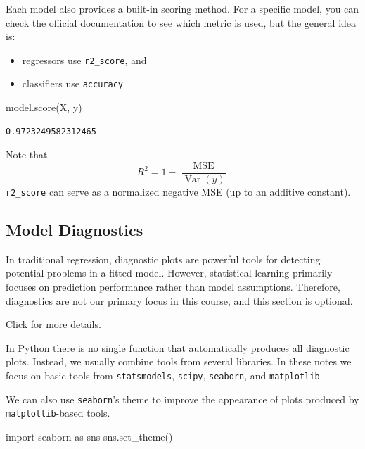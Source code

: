 \documentclass[
  letterpaper,
  DIV=11,
  numbers=noendperiod]{scrreprt}
\newenvironment{Shaded}{\begin{snugshade}}{\end{snugshade}}
\newcommand{\ImportTok}[1]{\textcolor[rgb]{0.00,0.46,0.62}{#1}}
\newcommand{\NormalTok}[1]{\textcolor[rgb]{0.00,0.23,0.31}{#1}}
\providecommand{\tightlist}{%
  \setlength{\itemsep}{0pt}\setlength{\parskip}{0pt}}
\theoremstyle{definition}
\theoremstyle{definition}
\theoremstyle{plain}
\theoremstyle{plain}
\theoremstyle{remark}
\begin{document}
Each model also provides a built-in scoring method. For a specific
model, you can check the official documentation to see which metric is
used, but the general idea is:

\begin{itemize}
\tightlist
\item
  regressors use \texttt{r2\_score}, and
\item
  classifiers use \texttt{accuracy}
\end{itemize}

\begin{Shaded}
\begin{Highlighting}[]
\NormalTok{model.score(X, y)}
\end{Highlighting}
\end{Shaded}

\begin{verbatim}
0.9723249582312465
\end{verbatim}

Note that \[
R^2=1-\frac{\operatorname{MSE}}{\operatorname{Var}(y)}
\] \texttt{r2\_score} can serve as a normalized negative MSE (up to an
additive constant).

\subsection{Model Diagnostics}\label{model-diagnostics}

In traditional regression, diagnostic plots are powerful tools for
detecting potential problems in a fitted model. However, statistical
learning primarily focuses on prediction performance rather than model
assumptions. Therefore, diagnostics are not our primary focus in this
course, and this section is optional.

Click for more details.

In Python there is no single function that automatically produces all
diagnostic plots. Instead, we usually combine tools from several
libraries. In these notes we focus on basic tools from
\texttt{statsmodels}, \texttt{scipy}, \texttt{seaborn}, and
\texttt{matplotlib}.

We can also use \texttt{seaborn}'s theme to improve the appearance of
plots produced by \texttt{matplotlib}-based tools.

\begin{Shaded}
\begin{Highlighting}[]
\ImportTok{import}\NormalTok{ seaborn }\ImportTok{as}\NormalTok{ sns}
\NormalTok{sns.set\_theme()}
\end{Highlighting}
\end{Shaded}
\end{document}
